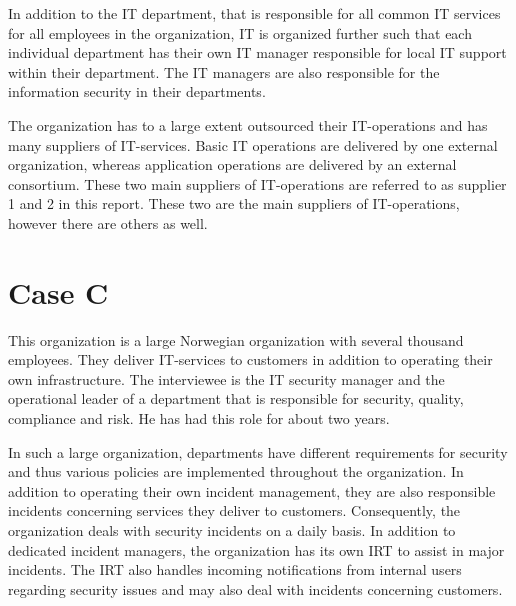 In addition to the IT department, that is responsible for all common IT services for all employees in the organization, IT is organized further such that each individual department has their own IT manager responsible for local IT support within their department. The IT managers are also responsible for the information security in their departments.

The organization has to a large extent outsourced their IT-operations and has    many suppliers of IT-services. Basic IT operations are delivered by one external organization, whereas application operations are delivered by an external consortium. These two main suppliers of IT-operations are referred to as supplier 1 and 2 in this report. These two are the main suppliers of IT-operations, however there are others as well. 


\section{Case C}
This organization is a large Norwegian organization with several thousand employees. They deliver IT-services to customers in addition to operating their own infrastructure. The interviewee is the IT security manager  and the operational leader of a department that is responsible for security, quality, compliance and risk. He has had this role for about two years.

In such a large organization, departments have different requirements for security and thus various policies are implemented throughout the organization. In addition to operating their own incident management, they are also responsible incidents concerning services they deliver to customers. Consequently, the organization deals with security incidents on a daily basis. In addition to dedicated incident managers, the organization has its own \ac{IRT} to assist in major incidents. The \ac{IRT} also handles incoming notifications from internal users regarding security issues and may also deal with incidents concerning customers. 